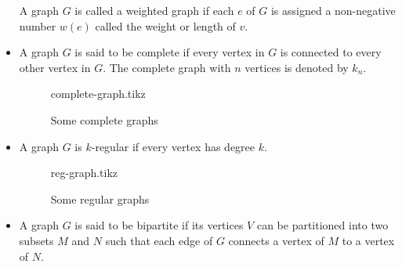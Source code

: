 \documentclass[../main-sheet.tex]{subfiles}
\begin{document}
\begin{itemize}
    A graph $ G $ is called a weighted graph if each $ e $ of $ G $ is assigned a non-negative number $ w(e) $ called the weight or length of $ v $. 
    \item A graph $ G $ is said to be complete if every vertex in $ G $ is connected to every other vertex in $ G $. The complete graph with $ n $ vertices is denoted by $ k_n $.
    \begin{figure}[h]
        \centering
        {complete-graph.tikz}
        \caption{Some complete graphs}
        \label{fig:comGraph}
    \end{figure}
    \item A graph $ G $ is $ k $-regular if every vertex has degree $ k $.
    \begin{figure}[H]
        \centering
        {reg-graph.tikz}
        \caption{Some regular graphs}
        \label{fig:regGraph}
    \end{figure}
    \item A graph $ G $ is said to be bipartite if its vertices $ V $ can be partitioned into two subsets $ M $ and $ N $ such that each edge of $ G $ connects a vertex of $ M $ to a vertex of $ N $.


\end{itemize}
\end{document}
